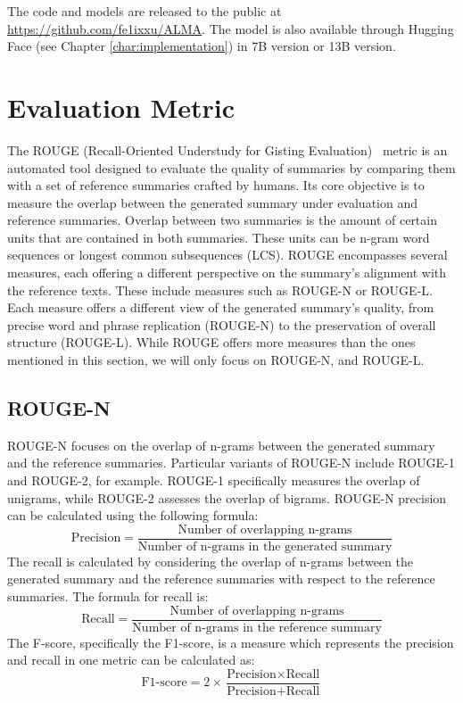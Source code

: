 \documentclass[english, ba, kiv, he, iso690numb, pdf, viewonly]{fasthesis}
\begin{document}
The code and models are released to the public at \url{https://github.com/fe1ixxu/ALMA}. The model is also available through Hugging Face (see Chapter \ref{char:implementation}) in 7B version or 13B version.

\section{Evaluation Metric}
The ROUGE (Recall-Oriented Understudy for Gisting Evaluation)~\cite{lin-2004-rouge} metric is an automated tool designed to evaluate the quality of summaries by comparing them with a set of reference summaries crafted by humans. Its core objective is to measure the overlap between the generated summary under evaluation and reference summaries. Overlap between two summaries is the amount of certain units that are contained in both summaries. These units can be n-gram word sequences or longest common subsequences (LCS).
ROUGE encompasses several measures, each offering a different perspective on the summary's alignment with the reference texts. These include measures such as ROUGE-N or ROUGE-L. Each measure offers a different view of the generated summary's quality, from precise word and phrase replication (ROUGE-N) to the preservation of overall structure (ROUGE-L). While ROUGE offers more measures than the ones mentioned in this section, we will only focus on ROUGE-N, and ROUGE-L.
\subsection{ROUGE-N}
ROUGE-N focuses on the overlap of n-grams between the generated summary and the reference summaries. Particular variants of ROUGE-N include ROUGE-1 and ROUGE-2, for example. ROUGE-1 specifically measures the overlap of unigrams, while ROUGE-2 assesses the overlap of bigrams. ROUGE-N precision can be calculated using the following formula:
$$ \text{Precision} = \frac{\text{Number of overlapping n-grams}}{\text{Number of n-grams in the generated summary}} $$
The recall is calculated by considering the overlap of n-grams between the generated summary and the reference summaries with respect to the reference summaries. The formula for recall is:
$$
\text{Recall} = \frac{\text{Number of overlapping n-grams}}{\text{Number of n-grams in the reference summary}}
$$
The F-score, specifically the F1-score, is a measure which represents the precision and recall in one metric can be calculated as:
$$
\text{F1-score} = 2 \times \frac{\text{Precision} \times \text{Recall}}{\text{Precision} + \text{Recall}}
$$
\end{document}
